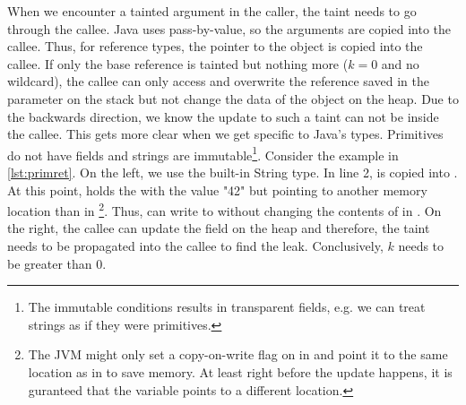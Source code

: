 \documentclass[../draft.tex]{subfiles}
\begin{document}
    When we encounter a tainted argument in the caller, the taint needs to go through the callee. Java uses pass-by-value, so the arguments are copied into the callee. Thus, for reference types, the pointer to the object is copied into the callee. If only the base reference is tainted but nothing more ($k=0$ and no wildcard), the callee can only access and overwrite the reference saved in the parameter on the stack but not change the data of the object on the heap. 
    Due to the backwards direction, we know the update to such a taint can not be inside the callee. This gets more clear when we get specific to Java's types. Primitives do not have fields and strings are immutable\footnote{The immutable conditions results in transparent fields, e.g. we can treat strings as if they were primitives.}. Consider the example in \autoref{lst:primret}. On the left, we use the built-in String type. In line 2,  is copied into . At this point,  holds the  with the value "42" but pointing to another memory location than  in \footnote{The JVM might only set a copy-on-write flag on  in  and point it to the same location as  in  to save memory. At least right before the update happens, it is guranteed that the variable points to a different location.}. Thus,  can write to  without changing the contents of  in . On the right, the callee can update the field on the heap and therefore, the taint needs to be propagated into the callee to find the leak. Conclusively, $k$ needs to be greater than $0$.
\end{document}
